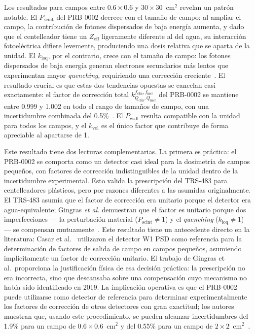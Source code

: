 \documentclass[11pt,a4paper]{article}
\begin{document}
Los resultados para campos entre $0{.}6 \times 0{.}6$ y $30 \times 30$~cm$^{2}$ revelan un patrón notable. El $P_{\mathrm{scint}}$ del PRB-0002 decrece con el tamaño de campo: al ampliar el campo, la contribución de fotones dispersados de baja energía aumenta, y dado que el centelleador tiene un $Z_{\mathrm{eff}}$ ligeramente diferente al del agua, su interacción fotoeléctrica difiere levemente, produciendo una dosis relativa que se aparta de la unidad. El $k_{\mathrm{ioq}}$, por el contrario, crece con el tamaño de campo: los fotones dispersados de baja energía generan electrones secundarios más lentos que experimentan mayor \textit{quenching}, requiriendo una corrección creciente~\cite{gingras2025}. El resultado crucial es que estas dos tendencias opuestas se cancelan casi exactamente: el factor de corrección total $k^{f_{\mathrm{clin}},f_{\mathrm{msr}}}_{Q_{\mathrm{clin}},Q_{\mathrm{msr}}}$ del PRB-0002 se mantiene entre 0.999 y 1.002 en todo el rango de tamaños de campo, con una incertidumbre combinada del 0.5\%~\cite{gingras2025}. El $P_{\mathrm{wall}}$ resulta compatible con la unidad para todos los campos, y el $k_{\mathrm{vol}}$ es el único factor que contribuye de forma apreciable al apartarse de 1.

Este resultado tiene dos lecturas complementarias. La primera es práctica: el PRB-0002 se comporta como un detector casi ideal para la dosimetría de campos pequeños, con factores de corrección indistinguibles de la unidad dentro de la incertidumbre experimental. Esto valida la prescripción del TRS-483 para centelleadores plásticos, pero por razones diferentes a las asumidas originalmente. El TRS-483 asumía que el factor de corrección era unitario porque el detector era agua-equivalente; Gingras \textit{et al.} demuestran que el factor es unitario porque dos imperfecciones --- la perturbación material ($P_{\mathrm{scint}} \neq 1$) y el \textit{quenching} ($k_{\mathrm{ioq}} \neq 1$) --- se compensan mutuamente~\cite{gingras2025}. Este resultado tiene un antecedente directo en la literatura: Casar et al.~\cite{casar2019}
utilizaron el detector W1 PSD como referencia para la determinación de factores de salida
de campo en campos pequeños, asumiendo implícitamente un factor de corrección unitario.
El trabajo de Gingras et al.\ proporciona la justificación física de esa decisión práctica:
la prescripción no era incorrecta, sino que descansaba sobre una compensación cuyo mecanismo
no había sido identificado en 2019. La implicación operativa es que el PRB-0002 puede utilizarse como detector de referencia para determinar experimentalmente los factores de corrección de otros detectores con gran exactitud; los autores muestran que, usando este procedimiento, se pueden alcanzar incertidumbres del 1.9\% para un campo de $0{.}6 \times 0{.}6$~cm$^{2}$ y del 0.55\% para un campo de $2 \times 2$~cm$^{2}$~\cite{gingras2025}.
\end{document}
